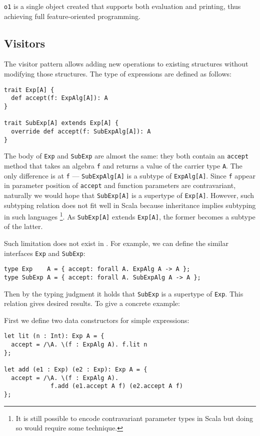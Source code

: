 \lstinline{o1} is a single object created that supports both evaluation and
printing, thus achieving full feature-oriented programming.

\subsection{Visitors}

The visitor pattern allows adding new operations to existing structures without
modifying those structures. The type of expressions are defined as follows:

\begin{verbatim}
trait Exp[A] {
  def accept(f: ExpAlg[A]): A
}

trait SubExp[A] extends Exp[A] {
  override def accept(f: SubExpAlg[A]): A
}
\end{verbatim}

The body of \lstinline{Exp} and \lstinline{SubExp} are almost the same: they
both contain an \lstinline{accept} method that takes an algebra \lstinline{f}
and returns a value of the carrier type \lstinline{A}. The only difference is at
\lstinline{f} --- \lstinline{SubExpAlg[A]} is a subtype of
\lstinline{ExpAlg[A]}. Since \lstinline{f} appear in parameter position of
\lstinline{accept} and function parameters are contravariant, naturally we would
hope that \lstinline{SubExp[A]} is a supertype of \lstinline{Exp[A]}. However,
such subtyping relation does not fit well in Scala because inheritance implies
subtyping in such languages \footnote{It is still possible to encode
  contravariant parameter types in Scala but doing so would require some
  technique.}. As \lstinline{SubExp[A]} extends \lstinline{Exp[A]}, the former
becomes a subtype of the latter.

Such limitation does not exist in \name. For example, we can define the similar interfaces \lstinline{Exp} and \lstinline{SubExp}:
\begin{verbatim}
type Exp    A = { accept: forall A. ExpAlg A -> A };
type SubExp A = { accept: forall A. SubExpAlg A -> A };
\end{verbatim}
Then by the typing judgment it holds that \lstinline{SubExp} is a supertype of
\lstinline{Exp}. This relation gives desired results. To give a concrete example:

First we define two data constructors for simple expressions:
\begin{verbatim}
let lit (n : Int): Exp A = {
  accept = /\A. \(f : ExpAlg A). f.lit n
};

let add (e1 : Exp) (e2 : Exp): Exp A = {
  accept = /\A. \(f : ExpAlg A).
             f.add (e1.accept A f) (e2.accept A f)
};
\end{verbatim}

